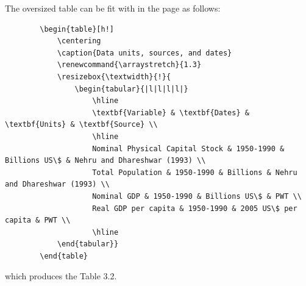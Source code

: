 The oversized table can be fit with in the page as follows: 
{\scriptsize
	\begin{verbatim}
		\begin{table}[h!]
			\centering
			\caption{Data units, sources, and dates}
			\renewcommand{\arraystretch}{1.3}
			\resizebox{\textwidth}{!}{
				\begin{tabular}{|l|l|l|l|}
					\hline
					\textbf{Variable} & \textbf{Dates} & \textbf{Units} & \textbf{Source} \\
					\hline
					Nominal Physical Capital Stock & 1950-1990 & Billions US\$ & Nehru and Dhareshwar (1993) \\
					Total Population & 1950-1990 & Billions & Nehru and Dhareshwar (1993) \\
					Nominal GDP & 1950-1990 & Billions US\$ & PWT \\
					Real GDP per capita & 1950-1990 & 2005 US\$ per capita & PWT \\
					\hline
			\end{tabular}}
		\end{table}
	\end{verbatim}
}
which produces the Table 3.2.

\begin{table}[h]
\centering
\caption{Data units, sources, and dates}
\renewcommand{\arraystretch}{1.3}
\end{table}

